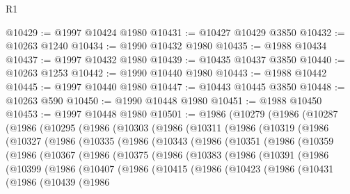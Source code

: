 \begin{lexlean}{R1}
\begin{coremodule}
@10429 := @1997 @10424 @1980
@10431 := @10427 @10429 @3850
@10432 := @10263 @1240
@10434 := @1990 @10432 @1980
@10435 := @1988 @10434
@10437 := @1997 @10432 @1980
@10439 := @10435 @10437 @3850
@10440 := @10263 @1253
@10442 := @1990 @10440 @1980
@10443 := @1988 @10442
@10445 := @1997 @10440 @1980
@10447 := @10443 @10445 @3850
@10448 := @10263 @590
@10450 := @1990 @10448 @1980
@10451 := @1988 @10450
@10453 := @1997 @10448 @1980
@10501 := @1986
    (@10279
      (@1986
        (@10287
          (@1986
            (@10295
              (@1986
                (@10303
                  (@1986
                    (@10311
                      (@1986
                        (@10319
                          (@1986
                            (@10327
                              (@1986
                                (@10335
                                  (@1986
                                    (@10343
                                      (@1986
                                        (@10351
                                          (@1986
                                            (@10359
                                              (@1986
                                                (@10367
                                                  (@1986
                                                    (@10375
                                                      (@1986
                                                        (@10383
                                                          (@1986
                                                            (@10391
                                                              (@1986
                                                                (@10399
                                                                  (@1986
                                                                    (@10407
                                                                      (@1986
                                                                        (@10415
                                                                          (@1986
                                                                            (@10423
                                                                              (@1986
                                                                                (@10431
                                                                                  (@1986
                                                                                    (@10439
                                                                                      (@1986

\end{coremodule}
\end{lexlean}
